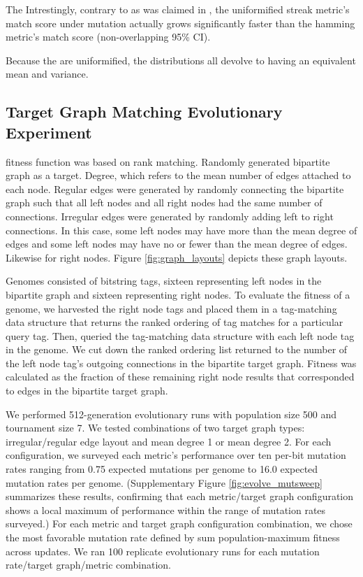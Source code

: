 The
Intrestingly, contrary to as was claimed in \citep{downing2015intelligence}, the uniformified streak metric's match score under mutation actually grows significantly faster than the hamming metric's match score  (non-overlapping 95\% CI).

Because the are uniformified, the distributions all devolve to having an equivalent mean and variance.

\subsection{Target Graph Matching Evolutionary Experiment}



fitness function was based on rank matching.
Randomly generated bipartite graph as a target.
Degree, which refers to the mean number of edges attached to each node.
Regular edges were generated by randomly connecting the bipartite graph such that all left nodes and all right nodes had the same number of connections.
Irregular edges were generated by randomly adding left to right connections.
In this case, some left nodes may have more than the mean degree of edges and some left nodes may have no or fewer than the mean degree of edges.
Likewise for right nodes.
Figure \ref{fig:graph_layouts} depicts these graph layouts.

Genomes consisted of bitstring tags, sixteen representing left nodes in the bipartite graph and sixteen representing right nodes.
To evaluate the fitness of a genome, we harvested the right node tags and placed them in a tag-matching data structure that returns the ranked ordering of tag matches for a particular query tag.
Then, queried the tag-matching data structure with each left node tag in the genome.
We cut down the ranked ordering list returned to the number of the left node tag's outgoing connections in the bipartite target graph.
Fitness was calculated as the fraction of these remaining right node results that corresponded to edges in the bipartite target graph.

We performed 512-generation evolutionary runs with population size 500 and tournament size 7.
We tested combinations of two target graph types: irregular/regular edge layout and mean degree 1 or mean degree 2.
For each configuration, we surveyed each metric's performance over ten per-bit mutation rates ranging from 0.75 expected mutations per genome to 16.0 expected mutation rates per genome.
(Supplementary Figure \ref{fig:evolve_mutsweep} summarizes these results, confirming that each metric/target graph configuration shows a local maximum of performance within the range of mutation rates surveyed.)
For each metric and target graph configuration combination, we chose the most favorable mutation rate defined by sum population-maximum fitness across updates.
We ran 100 replicate evolutionary runs for each mutation rate/target graph/metric combination.

